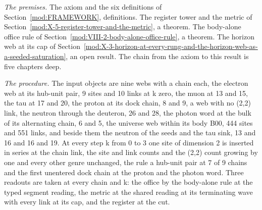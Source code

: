 \begin{chproof}
\textit{The premises.} The axiom and the six definitions of Section~\ref{mod:FRAMEWORK}, definitions. The register tower and the metric of Section~\ref{mod:X-5-register-tower-and-the-metric}, a theorem. The body-alone office rule of Section~\ref{mod:VIII-2-body-alone-office-rule}, a theorem. The horizon web at its cap of Section~\ref{mod:X-3-horizon-at-every-rung-and-the-horizon-web-as-a-seeded-saturation}, an open result. The chain from the axiom to this result is five chapters deep.

\textit{The procedure.} The input objects are nine webs with a chain each, the electron web at its hub-unit pair, 9 sites and 10 links at k zero, the muon at 13 and 15, the tau at 17 and 20, the proton at its dock chain, 8 and 9, a web with no (2,2) link, the neutron through the deuteron, 26 and 28, the photon word at the bulk of its alternating chain, 6 and 5, the universe web within its body B00, 444 sites and 551 links, and beside them the neutron of the seeds and the tau sink, 13 and 16 and 16 and 19. At every step k from 0 to 3 one site of dimension 2 is inserted in series at the chain link, the site and link counts and the (2,2) count growing by one and every other genre unchanged, the rule a hub-unit pair at 7 of 9 chains and the first unentered dock chain at the proton and the photon word. Three readouts are taken at every chain and k: the office by the body-alone rule at the typed segment reading, the metric at the shared reading at its terminating wave with every link at its cap, and the register at the cut.


\end{chproof}
